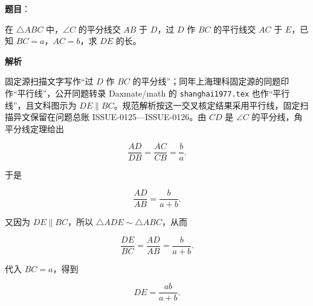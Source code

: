 \begin{answer}

\textbf{题目}：

在 $\triangle ABC$ 中，$\angle C$ 的平分线交 $AB$ 于 $D$，过 $D$ 作 $BC$ 的平行线交 $AC$ 于 $E$，已知 $BC=a$，$AC=b$，求 $DE$ 的长。
\nopagebreak[4]
\begin{center}\end{center}
\nopagebreak[4]
\textbf{解析}

固定源扫描文字写作“过 $D$ 作 $BC$ 的平分线”；同年上海理科固定源的同题印作“平行线”，公开同题转录 Daxmate/math 的 \texttt{shanghai1977.tex} 也作“平行线”，且文科图示为 $DE\parallel BC$。规范解析按这一交叉核定结果采用平行线，固定扫描异文保留在问题总账 ISSUE-0125—ISSUE-0126。由 $CD$ 是 $\angle C$ 的平分线，角平分线定理给出

\nopagebreak[4]
\[
\frac{AD}{DB}=\frac{AC}{CB}=\frac ba.
\]

于是

\nopagebreak[4]
\[
\frac{AD}{AB}=\frac{b}{a+b}.
\]

又因为 $DE\parallel BC$，所以 $\triangle ADE\sim\triangle ABC$，从而

\nopagebreak[4]
\[
\frac{DE}{BC}=\frac{AD}{AB}=\frac{b}{a+b}.
\]

代入 $BC=a$，得到

\nopagebreak[4]
\[
DE=\frac{ab}{a+b}.
\]


\end{answer}
